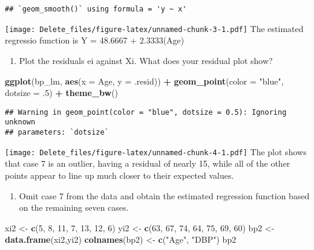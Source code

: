 \documentclass[
]{article}
\newenvironment{Shaded}{\begin{snugshade}}{\end{snugshade}}
\newcommand{\AttributeTok}[1]{\textcolor[rgb]{0.13,0.29,0.53}{#1}}
\newcommand{\DecValTok}[1]{\textcolor[rgb]{0.00,0.00,0.81}{#1}}
\newcommand{\FunctionTok}[1]{\textcolor[rgb]{0.13,0.29,0.53}{\textbf{#1}}}
\newcommand{\NormalTok}[1]{#1}
\newcommand{\OtherTok}[1]{\textcolor[rgb]{0.56,0.35,0.01}{#1}}
\newcommand{\SpecialCharTok}[1]{\textcolor[rgb]{0.81,0.36,0.00}{\textbf{#1}}}
\newcommand{\StringTok}[1]{\textcolor[rgb]{0.31,0.60,0.02}{#1}}
\providecommand{\tightlist}{%
  \setlength{\itemsep}{0pt}\setlength{\parskip}{0pt}}
\begin{document}
\begin{verbatim}
## `geom_smooth()` using formula = 'y ~ x'
\end{verbatim}

\texttt{[image: Delete\_files/figure-latex/unnamed-chunk-3-1.pdf]} The
estimated regressio function is Y = 48.6667 + 2.3333(Age)

\begin{enumerate}
\def\labelenumi{(\alph{enumi})}
\setcounter{enumi}{1}
\tightlist
\item
  Plot the residuals ei against Xi. What does your residual plot show?
\end{enumerate}

\begin{Shaded}
\begin{Highlighting}[]
\FunctionTok{ggplot}\NormalTok{(bp\_lm, }\FunctionTok{aes}\NormalTok{(}\AttributeTok{x =}\NormalTok{ Age, }\AttributeTok{y =}\NormalTok{ .resid)) }\SpecialCharTok{+} \FunctionTok{geom\_point}\NormalTok{(}\AttributeTok{color =} \StringTok{"blue"}\NormalTok{, }\AttributeTok{dotsize =}\NormalTok{ .}\DecValTok{5}\NormalTok{) }\SpecialCharTok{+} \FunctionTok{theme\_bw}\NormalTok{()}
\end{Highlighting}
\end{Shaded}

\begin{verbatim}
## Warning in geom_point(color = "blue", dotsize = 0.5): Ignoring unknown
## parameters: `dotsize`
\end{verbatim}

\texttt{[image: Delete\_files/figure-latex/unnamed-chunk-4-1.pdf]} The
plot shows that case 7 is an outlier, having a residual of nearly 15,
while all of the other points appear to line up much closer to their
expected values.

\begin{enumerate}
\def\labelenumi{(\alph{enumi})}
\setcounter{enumi}{2}
\tightlist
\item
  Omit case 7 from the data and obtain the estimated regression function
  based on the remaining seven cases.
\end{enumerate}

\begin{Shaded}
\begin{Highlighting}[]
\NormalTok{xi2 }\OtherTok{\textless{}{-}} \FunctionTok{c}\NormalTok{(}\DecValTok{5}\NormalTok{, }\DecValTok{8}\NormalTok{, }\DecValTok{11}\NormalTok{, }\DecValTok{7}\NormalTok{, }\DecValTok{13}\NormalTok{, }\DecValTok{12}\NormalTok{, }\DecValTok{6}\NormalTok{)}
\NormalTok{yi2 }\OtherTok{\textless{}{-}} \FunctionTok{c}\NormalTok{(}\DecValTok{63}\NormalTok{, }\DecValTok{67}\NormalTok{, }\DecValTok{74}\NormalTok{, }\DecValTok{64}\NormalTok{, }\DecValTok{75}\NormalTok{, }\DecValTok{69}\NormalTok{, }\DecValTok{60}\NormalTok{)}
\NormalTok{bp2 }\OtherTok{\textless{}{-}} \FunctionTok{data.frame}\NormalTok{(xi2,yi2)}
\FunctionTok{colnames}\NormalTok{(bp2) }\OtherTok{\textless{}{-}} \FunctionTok{c}\NormalTok{(}\StringTok{"Age"}\NormalTok{, }\StringTok{"DBP"}\NormalTok{)}
\NormalTok{bp2}
\end{Highlighting}
\end{Shaded}
\end{document}
